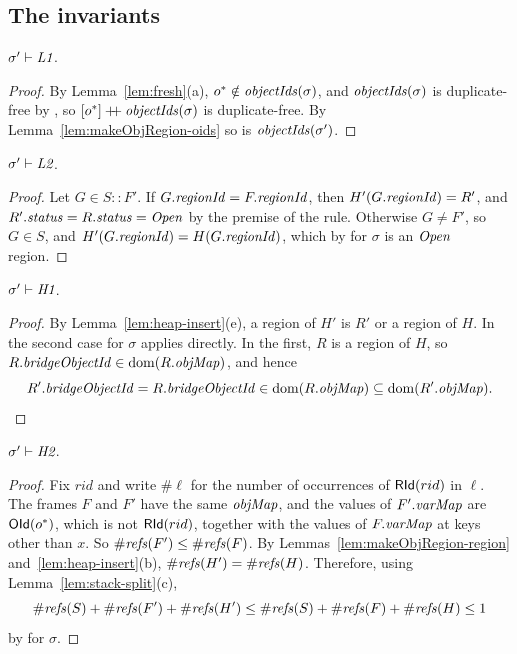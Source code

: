 \subsection{The invariants}

\begin{lemma}[\inv{L1}] 
$\sigma' \vdash \textit{L1}$.
\end{lemma}
\begin{proof}
By Lemma~\ref{lem:fresh}(a), $o^* \notin \mathit{objectIds}(\sigma)$, and $\mathit{objectIds}(\sigma)$ is duplicate-free by
, so $[o^*] \mathbin{+\!\!+} \mathit{objectIds}(\sigma)$ is duplicate-free. By Lemma~\ref{lem:makeObjRegion-oids} so is
$\mathit{objectIds}(\sigma')$.
\end{proof}

\begin{lemma}[\inv{L2}] 
$\sigma' \vdash \textit{L2}$.
\end{lemma}
\begin{proof}
Let $G \in S :: F'$. If $G.\mathit{regionId} = F.\mathit{regionId}$, then $H'(G.\mathit{regionId}) = R'$, and
$R'.\mathit{status} = R.\mathit{status} = \mathit{Open}$ by the premise of the rule. Otherwise $G \ne F'$, so $G \in S$, and
$H'(G.\mathit{regionId}) = H(G.\mathit{regionId})$, which by  for $\sigma$ is an $\mathit{Open}$ region.
\end{proof}

\begin{lemma}[\inv{H1}] 
$\sigma' \vdash \textit{H1}$.
\end{lemma}
\begin{proof}
By Lemma~\ref{lem:heap-insert}(e), a region of $H'$ is $R'$ or a region of $H$. In the second case
 for $\sigma$ applies directly. In the first, $R$ is a region of $H$, so
$R.\mathit{bridgeObjectId} \in \mathrm{dom}(R.\mathit{objMap})$, and hence
\[ R'.\mathit{bridgeObjectId} = R.\mathit{bridgeObjectId} \in \mathrm{dom}(R.\mathit{objMap}) \subseteq \mathrm{dom}(R'.\mathit{objMap}). \qedhere \]
\end{proof}

\begin{lemma}[\inv{H2}] 
$\sigma' \vdash \textit{H2}$.
\end{lemma}
\begin{proof}
Fix $rid$ and write $\#\ell$ for the number of occurrences of $\mathsf{RId}(rid)$ in $\ell$. The frames $F$
and $F'$ have the same $\mathit{objMap}$, and the values of $F'.\mathit{varMap}$ are $\mathsf{OId}(o^*)$, which is not
$\mathsf{RId}(rid)$, together with the values of $F.\mathit{varMap}$ at keys other than $x$. So
$\#\mathit{refs}(F') \le \#\mathit{refs}(F)$. By Lemmas~\ref{lem:makeObjRegion-region}
and~\ref{lem:heap-insert}(b), $\#\mathit{refs}(H') = \#\mathit{refs}(H)$. Therefore, using
Lemma~\ref{lem:stack-split}(c),
\[ \#\mathit{refs}(S) + \#\mathit{refs}(F') + \#\mathit{refs}(H') \le \#\mathit{refs}(S) + \#\mathit{refs}(F) + \#\mathit{refs}(H) \le 1 \]
by  for $\sigma$.
\end{proof}

